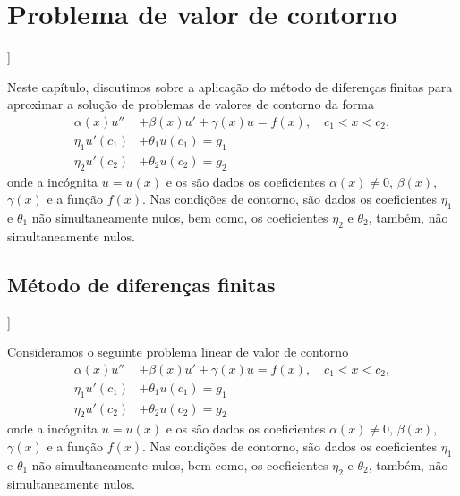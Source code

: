 
\chapter{Problema de valor de contorno}\label{cap_pvc}
\thispagestyle{fancy}

\begin{flushleft}
  [[tag:revisar]]
\end{flushleft}

Neste capítulo, discutimos sobre a aplicação do método de diferenças finitas para aproximar a solução de problemas de valores de contorno da forma
\begin{align}
  \alpha(x) u'' &+ \beta(x) u' + \gamma(x) u = f(x),\quad c_1 < x < c_2,\\
  \eta_1 u'(c_1) &+ \theta_1 u(c_1) = g_1\\
  \eta_2 u'(c_2) &+ \theta_2 u(c_2) = g_2
\end{align}
onde a incógnita $u = u(x)$ e os são dados os coeficientes $\alpha(x)\neq 0$, $\beta(x)$, $\gamma(x)$ e a função $f(x)$. Nas condições de contorno, são dados os coeficientes $\eta_1$ e $\theta_1$ não simultaneamente nulos, bem como, os coeficientes $\eta_2$ e $\theta_2$, também, não simultaneamente nulos.

\section{Método de diferenças finitas}\label{cap_pvc_sec_mdf}

\begin{flushleft}
  [[tag:revisar]]
\end{flushleft}

Consideramos o seguinte problema linear de valor de contorno
\begin{align}
  \alpha(x) u'' &+ \beta(x) u' + \gamma(x) u = f(x),\quad c_1 < x < c_2, \label{eq:pvc_eq}\\
  \eta_1 u'(c_1) &+ \theta_1 u(c_1) = g_1 \label{eq:pvc_bc1}\\
  \eta_2 u'(c_2) &+ \theta_2 u(c_2) = g_2 \label{eq:pvc_bc2}
\end{align}
onde a incógnita $u = u(x)$ e os são dados os coeficientes $\alpha(x)\neq 0$, $\beta(x)$, $\gamma(x)$ e a função $f(x)$. Nas condições de contorno, são dados os coeficientes $\eta_1$ e $\theta_1$ não simultaneamente nulos, bem como, os coeficientes $\eta_2$ e $\theta_2$, também, não simultaneamente nulos.

